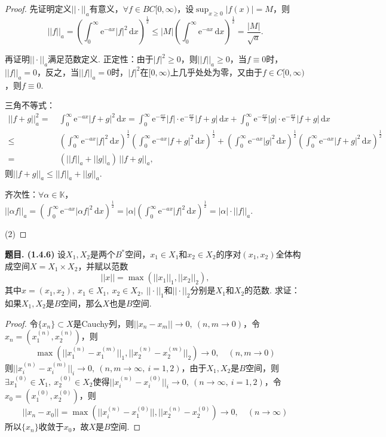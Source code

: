 \documentclass[12pt, a4paper, oneside]{ctexart}
\newcounter{problem}  %
\newenvironment{problem}[1][]{\stepcounter{problem}\par\noindent\textbf{题目\arabic{problem}. #1}}{\smallskip\par}
\let\leq=\leqslant %
\let\geq=\geqslant %
\def\K{\mathbb{K}}          %
\def\d{\mathrm{d}}          %
\def\e{\mathrm{e}}          %
\begin{document}
\begin{proof}
    先证明定义$||\cdot ||_a$有意义，$\forall f\in BC[0,\infty)$，设$\sup_{x\geq 0}|f(x)| = M$，则
    \begin{equation*}
    ||f||_a=\left(\int_0^\infty \e^{-ax}|f|^2\,\d x\right)^{\frac{1}{2}}\leq |M|\left(\int_0^\infty \e^{-ax}\,\d x\right)^{\frac{1}{2}}=\frac{|M|}{\sqrt{a}}.
    \end{equation*}

    再证明$||\cdot ||_a$满足范数定义. 正定性：由于$|f|^2\geq 0$，则$||f||_a\geq 0$，当$f\equiv 0$时，$||f||_a = 0$，反之，当$||f||_a=0$时，$|f|^2$在$[0,\infty)$上几乎处处为零，又由于$f\in C[0,\infty)$，则$f\equiv 0$.

    三角不等式：
    \begin{align*}
        ||f+g||_a^2 =&\ \int_0^{\infty}\e^{-ax}|f+g|^2\,\d x = \int_0^{\infty}\e^{-\frac{ax}{2}}|f|\cdot \e^{-\frac{ax}{2}}|f+g|\,\d x+\int_0^{\infty}\e^{-\frac{ax}{2}}|g|\cdot \e^{-\frac{ax}{2}}|f+g|\,\d x\\
        \leq&\ \left(\int_0^\infty \e^{-ax}|f|^2\,\d x\right)^{\frac{1}{2}}\left(\int_0^{\infty}\e^{-ax}|f+g|^2\,\d x\right)^{\frac{1}{2}}+\left(\int_0^\infty \e^{-ax}|g|^2\,\d x\right)^{\frac{1}{2}}\left(\int_0^{\infty}\e^{-ax}|f+g|^2\,\d x\right)^{\frac{1}{2}}\\
        =&\ (||f||_a+||g||_a)\,||f+g||_a,
    \end{align*}
    则$||f+g||_a\leq ||f||_a+||g||_a$.

    齐次性：$\forall \alpha \in \K$，$||\alpha f||_a=\left(\int_0^\infty \e^{-ax}|\alpha f|^2\,\d x\right)^{\frac{1}{2}}=|\alpha|\left(\int_0^\infty \e^{-ax}|f|^2\,\d x\right)^{\frac{1}{2}}=|\alpha|\cdot ||f||_a$.

    (2)
\end{proof}
\begin{problem}[(1.4.6)]
    设$X_1,X_2$是两个$B^*$空间，$x_1\in X_1$和$x_2\in X_2$的序对$(x_1,x_2)$全体构成空间$X=X_1\times X_2$，并赋以范数
    \begin{equation*}
        ||x|| = \max(||x_1||_1,||x_2||_2),
    \end{equation*}
    其中$x=(x_1,x_2),\ x_1\in X_1,\ x_2\in X_2,\ ||\cdot ||_1$和$||\cdot ||_2$分别是$X_1$和$X_2$的范数. 求证：如果$X_1,X_2$是$B$空间，那么$X$也是$B$空间.
\end{problem}
\begin{proof}
    令$\{x_n\}\subset X$是Cauchy列，则$||x_n-x_m||\to 0,\ (n,m\to 0)$，令$x_n = (x_1^{(n)}, x_2^{(n)})$，则
    \begin{equation*}
        \max\left(||x_1^{(n)}-x_1^{(m)}||_1,||x_2^{(n)}-x_2^{(m)}||_2\right)\to 0,\quad (n,m\to 0)
    \end{equation*}
    则$||x_i^{(n)}-x_i^{(m)}||_i\to 0,\ (n,m\to\infty,\ i=1,2)$，由于$X_1,X_2$是$B$空间，则$\exists x_1^{(0)}\in X_1,\ x_2^{(0)}\in X_2$使得$||x_i^{(n)}-x_i^{(0)}||_i\to 0,\ (n\to\infty,\ i=1,2)$，令$x_0 = (x_1^{(0)}, x_2^{(0)})$，则
    \begin{equation*}
        ||x_n-x_0|| = \max(||x_i^{(n)}-x_1^{(0)}||, ||x_2^{(n)}-x_2^{(0)})\to 0,\quad(n\to \infty)
    \end{equation*}
    所以$\{x_n\}$收敛于$x_0$，故$X$是$B$空间.
\end{proof}
\end{document}
